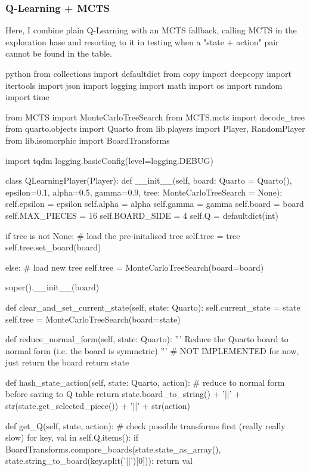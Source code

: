 \subsubsection{Q-Learning + MCTS}

Here, I combine plain Q-Learning with an MCTS fallback, calling MCTS in the exploration hase and resorting to it in testing when a "state + action" pair cannot be found in the table.

\begin{mintedbox}{python}
from collections import defaultdict
from copy import deepcopy
import itertools
import json
import logging
import math
import os
import random
import time

from MCTS import MonteCarloTreeSearch
from MCTS.mcts import decode_tree
from quarto.objects import Quarto
from lib.players import Player, RandomPlayer
from lib.isomorphic import BoardTransforms

import tqdm
logging.basicConfig(level=logging.DEBUG)


class QLearningPlayer(Player):
    def __init__(self, board: Quarto = Quarto(), epsilon=0.1, alpha=0.5, gamma=0.9, tree: MonteCarloTreeSearch = None):
        self.epsilon = epsilon
        self.alpha = alpha
        self.gamma = gamma
        self.board = board
        self.MAX_PIECES = 16
        self.BOARD_SIDE = 4
        self.Q = defaultdict(int)

        if tree is not None:
            # load the pre-initalised tree
            self.tree = tree
            self.tree.set_board(board)

        else:
            # load new tree
            self.tree = MonteCarloTreeSearch(board=board)

        super().__init__(board)

    def clear_and_set_current_state(self, state: Quarto):
        self.current_state = state
        self.tree = MonteCarloTreeSearch(board=state)

    def reduce_normal_form(self, state: Quarto):
        '''
        Reduce the Quarto board to normal form (i.e. the board is symmetric)
        '''
        # NOT IMPLEMENTED for now, just return the board
        return state

    def hash_state_action(self, state: Quarto, action):
        # reduce to normal form before saving to Q table
        return state.board_to_string() + '||' + str(state.get_selected_piece()) + '||' + str(action)

    def get_Q(self, state, action):
        # check possible transforms first (really really slow)
        for key, val in self.Q.items():
            if BoardTransforms.compare_boards(state.state_as_array(), state.string_to_board(key.split('||')[0])):
                return val


\end{mintedbox}
